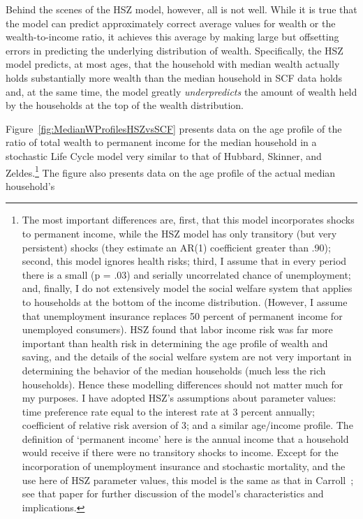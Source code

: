\documentclass[titlepage,12pt]{article}
\begin{document}
Behind the scenes of the HSZ model, however, all is not well.  While 
it is true that the model can predict approximately correct average 
values for wealth or the wealth-to-income ratio, it achieves this 
average by making large but offsetting errors in predicting the 
underlying distribution of wealth.  Specifically, the HSZ model 
predicts, at most ages, that the household with median wealth actually 
holds substantially more wealth than the median household in SCF data 
holds and, at the same time, the model greatly {\it underpredicts} the 
amount of wealth held by the households at the top of the wealth 
distribution.

Figure~\ref{fig:MedianWProfilesHSZvsSCF} presents data on the age 
profile of the ratio of total wealth to permanent income for the 
median household in a stochastic Life Cycle model very similar to that 
of Hubbard, Skinner, and Zeldes.\footnote{The most important 
differences are, first, that this model incorporates shocks to 
permanent income, while the HSZ model has only transitory (but very 
persistent) shocks (they estimate an AR(1) coefficient greater than 
.90); second, this model ignores health risks; third, I assume that in 
every period there is a small (p = .03) and serially uncorrelated 
chance of unemployment; and, finally, I do not extensively model the 
social welfare system that applies to households at the bottom of the 
income distribution.  (However, I assume that unemployment insurance 
replaces 50 percent of permanent income for unemployed consumers).  
HSZ found that labor income risk was far more important than health 
risk in determining the age profile of wealth and saving, and the 
details of the social welfare system are not very important in 
determining the behavior of the median households (much less the rich 
households).  Hence these modelling differences should not matter much 
for my purposes.  I have adopted HSZ's assumptions about parameter 
values: time preference rate equal to the interest rate at 3 percent 
annually; coefficient of relative risk aversion of 3; and a similar 
age/income profile.  The definition of `permanent income' here is the 
annual income that a household would receive if there were no 
transitory shocks to income.  Except for the incorporation of 
unemployment insurance and stochastic mortality, and the use here of 
HSZ parameter values, this model is the same as that in 
Carroll~\citeyear{carrollBSLCPIH}; see that paper for further discussion 
of the model's characteristics and implications.} The figure also 
presents data on the age profile of the actual median household's 
\end{document}

